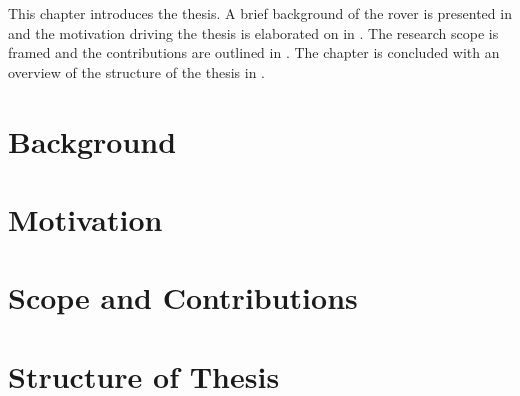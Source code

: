 This chapter introduces the thesis. A brief background of the rover is presented in  and the motivation driving the thesis is elaborated on in . The research scope is framed and the contributions are outlined in . The chapter is concluded with an overview of the structure of the thesis in .

\section{Background}
\label{sec:Introduction:Background}


\section{Motivation}
\label{sec:Introduction:Motivation}


\section{Scope and Contributions}
\label{sec:Introduction:ScopeAndContributions}


\section{Structure of Thesis}
\label{sec:Introduction:StructureOfThesis}

